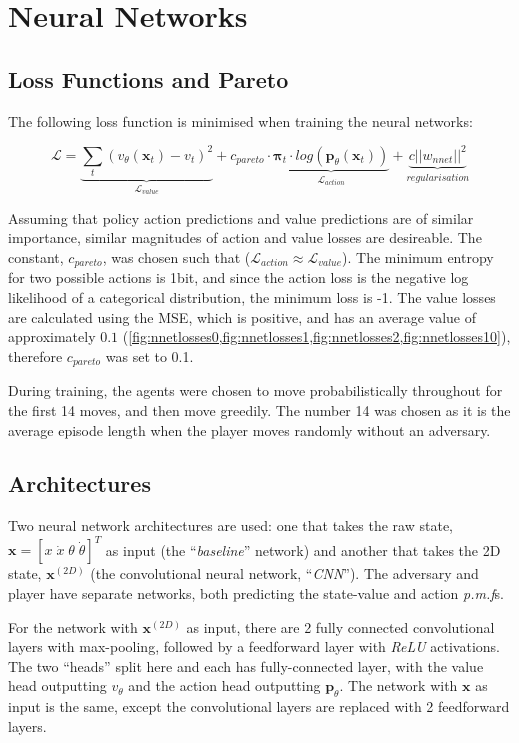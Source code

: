 \documentclass[../main.tex]{subfiles}
\begin{document}
\section{Neural Networks}
\subsection{Loss Functions and Pareto}

The following loss function is minimised when training the neural networks:

\begin{equation}
   \mathcal{L} = \underbrace{\sum_t (v_\theta (\boldsymbol{x}_t) - v_t)^2}_{\mathcal{L}_{value}} + c_{pareto} \cdot \underbrace{\boldsymbol{\pi}_t \cdot log(\boldsymbol{p}_\theta(\boldsymbol{x}_t))}_{\mathcal{L}_{action}}  + \underbrace{c||w_{nnet}||^2}_{regularisation}
\end{equation}

Assuming that policy action predictions and value predictions are of similar importance, similar magnitudes of action and value losses are desireable. The constant, $c_{pareto}$, was chosen such that ($\mathcal{L}_{action} \approx \mathcal{L}_{value}$). The minimum entropy for two possible actions is 1bit, and since the action loss is the negative log likelihood of a categorical distribution, the minimum loss is -1. The value losses are calculated using the MSE, which is positive, and has an average value of approximately $0.1$ (\cref{fig:nnetlosses0,fig:nnetlosses1,fig:nnetlosses2,fig:nnetlosses10}), therefore $c_{pareto}$ was set to 0.1.

During training, the agents were chosen to move probabilistically throughout for the first 14 moves, and then move greedily. The number 14 was chosen as it is the average episode length when the player moves randomly without an adversary.

\subsection{Architectures}
\label{sec:architectures}
Two neural network architectures are used: one that takes the raw state, $\boldsymbol{x} = [x \; \dot{x} \; \theta \; \dot{\theta}]^T$ as input (the ``\textit{baseline}'' network) and another that takes the 2D state, $\boldsymbol{x}^{(2D)}$ (the convolutional neural network, ``\textit{CNN}''). The adversary and player have separate networks, both predicting the state-value and action \textit{p.m.f}s.

For the network with $\boldsymbol{x}^{(2D)}$ as input, there are 2 fully connected convolutional layers with max-pooling, followed by a feedforward layer with \textit{ReLU} activations. The two ``heads'' split here and each has fully-connected layer, with the value head outputting $v_\theta$ and the action head outputting $\boldsymbol{p}_\theta$. The network with $\boldsymbol{x}$ as input is the same, except the convolutional layers are replaced with 2 feedforward layers.
\end{document}
